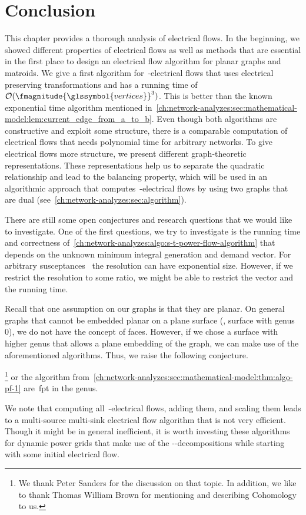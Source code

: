 \section{Conclusion}
% 
This chapter provides a thorough analysis of electrical flows. In the beginning,
we showed different properties of electrical flows as well as methods that are
essential in the first place to design an electrical flow algorithm for planar
graphs and matroids. We give a first algorithm for~\source-\sink electrical
flows that uses electrical preserving transformations and has a running time
of~$
    \bigO(\fmagnitude{\glssymbol{vertices}}^3)
$. This is better than the known exponential time algorithm mentioned
in~\cref{ch:network-analyzes:sec:mathematical-model:lem:current_edge_from_a_to_b}.
Even though both algorithms are constructive and exploit some structure, there
is a comparable computation of electrical flows that needs polynomial time for
arbitrary networks. To give electrical flows more structure, we present
different graph-theoretic representations. These representations help us to
separate the quadratic relationship and lead to the balancing property, which
will be used in an algorithmic approach that computes~\source-\sink electrical
flows by using two graphs that are dual
(see~\cref{ch:network-analyzes:sec:algorithm}).

There are still some open conjectures and research questions that we would like
to investigate. One of the first questions, we try to investigate is the running
time and correctness of~\cref{ch:network-analyzes:algo:s-t-power-flow-algorithm}
that depends on the unknown minimum integral generation and demand vector. For
arbitrary susceptances~ the resolution can have
exponential size. However, if we restrict the resolution to some ratio, we might
be able to restrict the vector and the running time.

Recall that one assumption on our graphs is that they are planar. On general
graphs that cannot be embedded planar on a plane surface (\ie, surface with
genus 0), we do not have the concept of faces. However, if we chose a surface
with higher genus that allows a plane embedding of the graph, we can make use of
the aforementioned algorithms. Thus, we raise the following conjecture.
% 
\begin{conjecture}
    \footnote{We thank Peter Sanders for the discussion on that topic. In
    addition, we like to thank Thomas William Brown for mentioning and
    describing Cohomology to us.}
     or the algorithm
    from~\cref{ch:network-analyzes:sec:mathematical-model:thm:algo-pf-1}
    are~\gls{fpt} in the genus.
\end{conjecture}
% 
We note that computing all~\source-\sink electrical flows, adding them, and
scaling them leads to a multi-source multi-sink electrical flow algorithm that
is not very efficient. Though it might be in general inefficient, it is worth
investing these algorithms for dynamic power grids that make use of the
\source-\sink-decompositions while starting with some initial electrical flow.
%